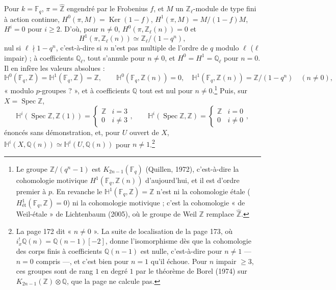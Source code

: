 \documentclass[11pt,a4paper]{article}
\begin{document}
Pour $k = \mathbb{F}_{q}$, $\pi = \widehat{\mathbb{Z}}$ engendré par le Frobenius
$f$, et $M$ un $\mathbb{Z}_{\ell}$-module de type fini à action continue,
$H^{0}(\pi, M) = \operatorname{Ker}(1 - f)$, $H^{1}(\pi, M) = M/(1 - f)M$,
$H^{i} = 0$ pour $i \geqslant 2$. D'où, pour $n \neq 0$, $H^{0}(\pi,
\mathbb{Z}_{\ell}(n)) = 0$ et
\[
  H^{1}(\pi, \mathbb{Z}_{\ell}(n)) \simeq \mathbb{Z}_{\ell}/(1 - q^{n}) ,
\]
nul si $\ell \nmid 1 - q^{n}$, c'est-à-dire si $n$ n'est pas multiple de l'ordre
de $q$ modulo $\ell$ ($\ell$ impair) ; à coefficients $\mathbb{Q}_{\ell}$, tout
s'annule pour $n \neq 0$, et $H^{0} = H^{1} = \mathbb{Q}_{\ell}$ pour $n = 0$. Il
en infère les valeurs absolues :
\[
  \mathbb{H}^{0}(\mathbb{F}_{q}, \mathbb{Z}) = \mathbb{H}^{1}(\mathbb{F}_{q},
  \mathbb{Z}) = \mathbb{Z}, \qquad \mathbb{H}^{0}(\mathbb{F}_{q}, \mathbb{Z}(n))
  = 0, \quad \mathbb{H}^{1}(\mathbb{F}_{q}, \mathbb{Z}(n)) =
  \mathbb{Z}/(1 - q^{n}) \quad (n \neq 0),
\]
« modulo $p$-groupes ? », et à coefficients $\mathbb{Q}$ tout est nul pour $n
\neq 0$.\footnote{Le groupe $\mathbb{Z}/(q^{n} - 1)$ est
$K_{2n-1}(\mathbb{F}_{q})$ (Quillen, 1972), c'est-à-dire la cohomologie motivique
$H^{1}(\mathbb{F}_{q}, \mathbb{Z}(n))$ d'aujourd'hui, et il est d'ordre premier
à $p$. En revanche le $\mathbb{H}^{1}(\mathbb{F}_{q}, \mathbb{Z}) = \mathbb{Z}$
n'est ni la cohomologie étale ($H^{1}_{\text{ét}}(\mathbb{F}_{q}, \mathbb{Z}) =
0$) ni la cohomologie motivique ; c'est la cohomologie « de Weil-étale » de
Lichtenbaum (2005), où le groupe de Weil $\mathbb{Z}$ remplace
$\widehat{\mathbb{Z}}$.} Puis, sur $X = \operatorname{Spec} \mathbb{Z}$,
\[
  \mathbb{H}^{i}(\operatorname{Spec} \mathbb{Z}, \mathbb{Z}(1)) = \begin{cases}
  \mathbb{Z} & i = 3 \\ 0 & i \neq 3 \end{cases} , \qquad
  \mathbb{H}^{i}(\operatorname{Spec} \mathbb{Z}, \mathbb{Z}) = \begin{cases}
  \mathbb{Z} & i = 0 \\ 0 & i \neq 0 \end{cases} ,
\]
énoncés sans démonstration, et, pour $U$ ouvert de $X$, $\mathbb{H}^{i}(X,
\mathbb{Q}(n)) \simeq \mathbb{H}^{i}(U, \mathbb{Q}(n))$ pour $n \neq 1$.\footnote{La
page 172 dit « $n \neq 0$ ». La suite de localisation de la page 173, où
$i_{x}^{!}\mathbb{Q}(n) = \mathbb{Q}(n-1)[-2]$, donne l'isomorphisme dès que la
cohomologie des corps finis à coefficients $\mathbb{Q}(n-1)$ est nulle,
c'est-à-dire pour $n \neq 1$ --- $n = 0$ compris ---, et c'est bien pour $n = 1$
qu'il échoue. Pour $n$ impair $\geqslant 3$, ces groupes sont de rang $1$ en degré
$1$ par le théorème de Borel (1974) sur $K_{2n-1}(\mathbb{Z}) \otimes \mathbb{Q}$,
que la page ne calcule pas.}
\end{document}
